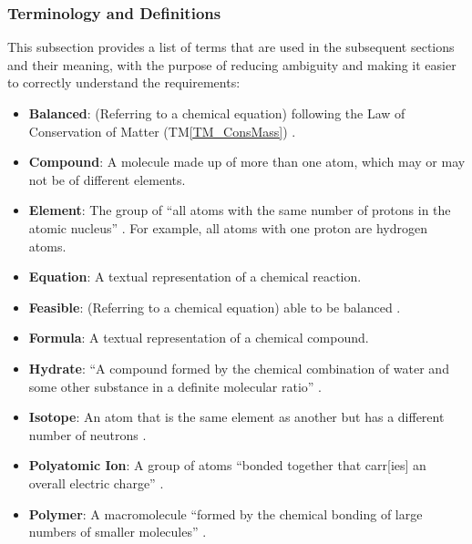 \documentclass[12pt]{article}
\newcommand{\tmref}[1]{TM\ref{#1}}
\begin{document}
\subsubsection{Terminology and  Definitions} \label{sec_termsDefs}
This subsection provides a list of terms that are used in the subsequent
sections and their meaning, with the purpose of reducing ambiguity and making it
easier to correctly understand the requirements:

\begin{itemize}
  \item \textbf{Balanced}: (Referring to a chemical equation) following the Law
        of Conservation of Matter (\tmref{TM_ConsMass})
        \cite{lund_introduction_2023}.

  \item \textbf{Compound}: A molecule made up of more than one atom, which may
        or may not be of different elements.

  \item \textbf{Element}: The group of ``all atoms with the same number of
        protons in the atomic nucleus'' \cite{hartshorn_brief_2015}. For
        example, all atoms with one proton are hydrogen atoms.

  \item \textbf{Equation}: A textual representation of a chemical reaction.

  \item \textbf{Feasible}: (Referring to a chemical equation) able to be
        balanced \cite{hamid_balancing_2019}.

  \item \textbf{Formula}: A textual representation of a chemical compound.

  \item \textbf{Hydrate}: ``A compound formed by the chemical combination of
        water and some other substance in a definite molecular ratio''
        \cite{harpercollins_publishers_hydrate_nodate}.

  \item \textbf{Isotope}: An atom that is the same element as another but has a
        different number of neutrons \cite{lund_introduction_2023}.

  \item \textbf{Polyatomic Ion}: A group of atoms ``bonded together that
        carr[ies] an overall electric charge'' \cite{lund_introduction_2023}.

  \item \textbf{Polymer}: A macromolecule ``formed by the chemical bonding of
        large numbers of smaller molecules'' \cite{wexler_encyclopedia_2014}.


\end{itemize}
\end{document}
